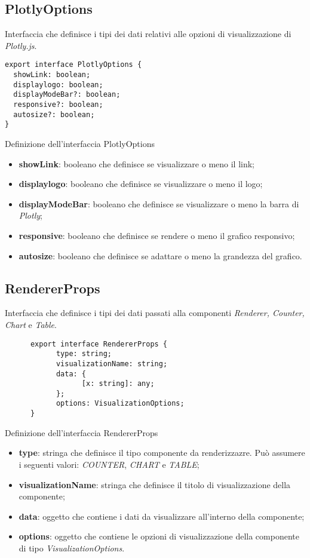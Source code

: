 \subsection{PlotlyOptions}
Interfaccia che definisce i tipi dei dati relativi alle opzioni di visualizzazione di \textit{Plotly.js}.
\begin{verbatim}
export interface PlotlyOptions {
  showLink: boolean;
  displaylogo: boolean;
  displayModeBar?: boolean;
  responsive?: boolean;
  autosize?: boolean;
}
\end{verbatim}
\begin{listing}[H]
      \caption{Definizione dell'interfaccia PlotlyOptions}
      \label{listing:plotlyOptions}
\end{listing}
\begin{itemize}
      \item \textbf{showLink}: booleano che definisce se visualizzare o meno il link;
      \item \textbf{displaylogo}: booleano che definisce se visualizzare o meno il logo;
      \item \textbf{displayModeBar}: booleano che definisce se visualizzare o meno la barra di \textit{Plotly};
      \item \textbf{responsive}: booleano che definisce se rendere o meno il grafico responsivo;
      \item \textbf{autosize}: booleano che definisce se adattare o meno la grandezza del grafico.
\end{itemize}

\subsection{RendererProps}
Interfaccia che definisce i tipi dei dati passati alla componenti \textit{Renderer, Counter, Chart} e \textit{Table}.
\begin{listing}[H]
      \begin{verbatim}
      export interface RendererProps {
            type: string;
            visualizationName: string;
            data: {
                  [x: string]: any;
            };
            options: VisualizationOptions;
      }
      \end{verbatim}
      \caption{Definizione dell'interfaccia RendererProps}
      \label{listing:rendererProps}
\end{listing}
\begin{itemize}
      \item \textbf{type}: stringa che definisce il tipo componente da renderizzazre. Può assumere i seguenti valori: \textit{COUNTER}, \textit{CHART} e \textit{TABLE};
      \item \textbf{visualizationName}: stringa che definisce il titolo di visualizzazione della componente;
      \item \textbf{data}: oggetto che contiene i dati da visualizzare all'interno della componente;
      \item \textbf{options}: oggetto che contiene le opzioni di visualizzazione della componente di tipo \textit{VisualizationOptions}.
\end{itemize}

